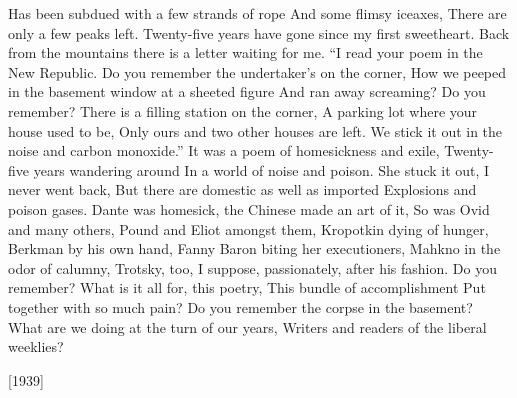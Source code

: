 \begin{poem}
    Has been subdued with a few strands of rope 
    And some flimsy iceaxes, 
    There are only a few peaks left. 
    Twenty-five years have gone since my first sweetheart. 
    Back from the mountains there is a letter waiting for me. 
    ``I read your poem in the New Republic. 
    Do you remember the undertaker's on the corner, 
    How we peeped in the basement window at a sheeted figure 
    And ran away screaming? Do you remember? 
    There is a filling station on the corner, 
    A parking lot where your house used to be, 
    Only ours and two other houses are left. 
    We stick it out in the noise and carbon monoxide.'' 
    It was a poem of homesickness and exile, 
    Twenty-five years wandering around 
    In a world of noise and poison. 
    She stuck it out, I never went back, 
    But there are domestic as well as imported 
    Explosions and poison gases. 
    Dante was homesick, the Chinese made an art of it, 
    So was Ovid and many others, 
    Pound and Eliot amongst them, 
    Kropotkin dying of hunger, 
    Berkman by his own hand, 
    Fanny Baron biting her executioners, 
    Mahkno in the odor of calumny, 
    Trotsky, too, I suppose, passionately, after his fashion. 
    Do you remember? 
    What is it all for, this poetry, 
    This bundle of accomplishment 
    Put together with so much pain? 
    Do you remember the corpse in the basement? 
    What are we doing at the turn of our years, 
    Writers and readers of the liberal weeklies? 

\hfill [1939]
\end{poem}


